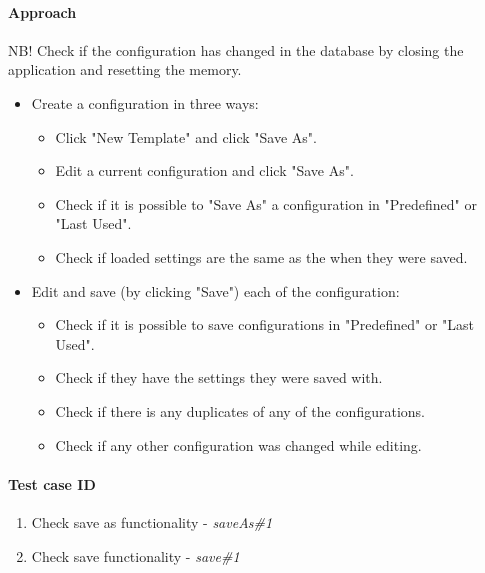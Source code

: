 \paragraph{Approach}
	NB! Check if the configuration has changed in the database by closing the application and resetting the memory.
		\begin{itemize} 
			\item Create a configuration in three ways:
				\begin{itemize}
					\item Click "New Template" and click "Save As".
					\item Edit a current configuration and click "Save As".
					\item Check if it is possible to "Save As" a configuration in "Predefined" or "Last Used".
					\item Check if loaded settings are the same as the when they were saved. 
				\end{itemize}
			\item Edit and save (by clicking "Save") each of the configuration:
		\begin{itemize}
			\item Check if it is possible to save configurations in "Predefined" or "Last Used".
			\item Check if they have the settings they were saved with.
			\item Check if there is any duplicates of any of the configurations.
			\item Check if any other configuration was changed while editing.	
		\end{itemize}
	\end{itemize}
\paragraph{Test case ID}
	\begin{enumerate}
		\item Check save as functionality - \textit{saveAs\#1}
		\item Check save functionality - \textit{save\#1}
	\end{enumerate}
